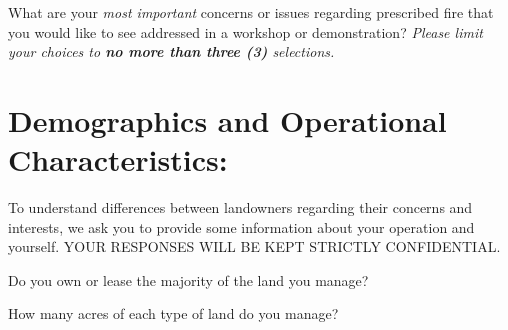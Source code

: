 \documentclass[
  english,
  checkmode = fill,
  ]{sdapsclassic}
\begin{document}
\begin{sloppypar}
\begin{questionnaire}
    \begin{choicequestion}[cols=2]{What are your \emph{most important} concerns or issues regarding prescribed fire that you would like to see addressed in a workshop or demonstration? \emph{Please limit your choices to \textbf{no more than three (3)} selections.}}
    \end{choicequestion}  

\vspace{5em}
  
    \section{Demographics and Operational Characteristics:}
    
  To understand differences between landowners regarding their concerns and interests, we ask you to provide some information about your operation and yourself. YOUR RESPONSES WILL BE KEPT STRICTLY CONFIDENTIAL.
    

    \begin{choicequestion}[cols=3]{Do you own or lease the majority of the land you manage?}
    \end{choicequestion}

    \begin{choicequestion}[cols=1]{How many acres of each type of land do you manage?}
    \end{choicequestion}      
    

\end{questionnaire}
\end{sloppypar}
\end{document}
